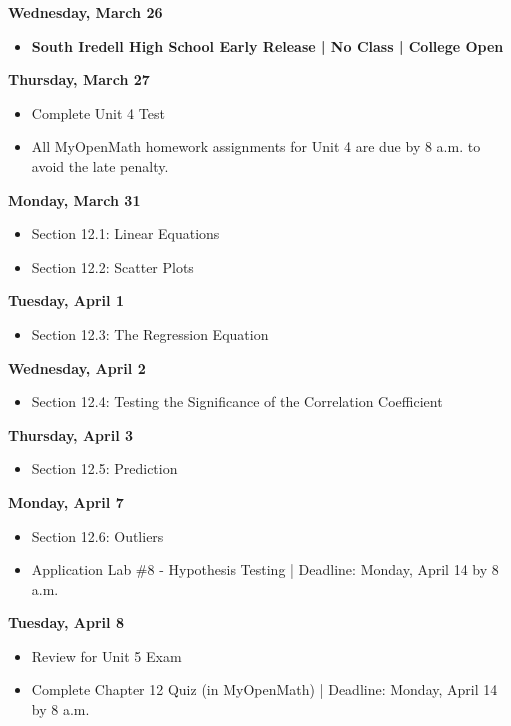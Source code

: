 \documentclass[11pt]{article}
\begin{document}
\textbf{Wednesday, March 26}

\begin{itemize}
\item \textbf{South Iredell High School Early Release | No Class | College Open}
\end{itemize}

\textbf{Thursday, March 27}

\begin{itemize}
\item Complete Unit 4 Test
\item All MyOpenMath homework assignments for Unit 4 are due by 8 a.m. to avoid the late penalty.
\end{itemize}

\textbf{Monday, March 31}

\begin{itemize}
\item Section 12.1: Linear Equations
\item Section 12.2: Scatter Plots
\end{itemize}

\textbf{Tuesday, April 1}

\begin{itemize}
\item Section 12.3: The Regression Equation
\end{itemize}

\textbf{Wednesday, April 2}

\begin{itemize}
\item Section 12.4: Testing the Significance of the Correlation Coefficient
\end{itemize}

\textbf{Thursday, April 3}

\begin{itemize}
\item Section 12.5: Prediction
\end{itemize}

\textbf{Monday, April 7}

\begin{itemize}
\item Section 12.6: Outliers
\item Application Lab \#8 - Hypothesis Testing | Deadline: Monday, April 14 by 8 a.m.
\end{itemize}

\textbf{Tuesday, April 8}

\begin{itemize}
\item Review for Unit 5 Exam
\item Complete Chapter 12 Quiz (in MyOpenMath) | Deadline: Monday, April 14 by 8 a.m.
\end{itemize}
\end{document}
